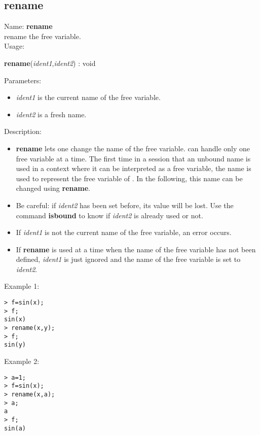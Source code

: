 \subsection{rename}
\label{labrename}
\noindent Name: \textbf{rename}\\
rename the free variable.\\
\noindent Usage: 
\begin{center}
\textbf{rename}(\emph{ident1},\emph{ident2}) : \textsf{void}
\end{center}
Parameters: 
\begin{itemize}
\item \emph{ident1} is the current name of the free variable.
\item \emph{ident2} is a fresh name.
\end{itemize}
\noindent Description: \begin{itemize}

\item \textbf{rename} lets one change the name of the free variable. \sollya can handle only
   one free variable at a time. The first time in a session that an unbound name 
   is used in a context where it can be interpreted as a free variable, the name
   is used to represent the free variable of \sollya. In the following, this name
   can be changed using \textbf{rename}.

\item Be careful: if \emph{ident2} has been set before, its value will be lost. Use the 
   command \textbf{isbound} to know if \emph{ident2} is already used or not.

\item If \emph{ident1} is not the current name of the free variable, an error occurs.

\item If \textbf{rename} is used at a time when the name of the free variable has not been 
   defined, \emph{ident1} is just ignored and the name of the free variable is 
   set to \emph{ident2}.
\end{itemize}
\noindent Example 1: 
\begin{center}\begin{minipage}{15cm}\begin{Verbatim}[frame=single]
> f=sin(x);
> f;
sin(x)
> rename(x,y);
> f;
sin(y)
\end{Verbatim}
\end{minipage}\end{center}
\noindent Example 2: 
\begin{center}\begin{minipage}{15cm}\begin{Verbatim}[frame=single]
> a=1;
> f=sin(x);
> rename(x,a);
> a;
a
> f;
sin(a)
\end{Verbatim}
\end{minipage}\end{center}
